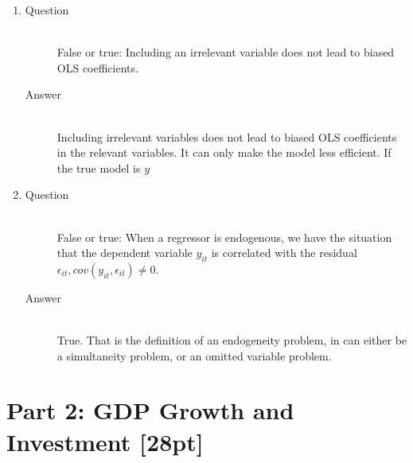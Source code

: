 \documentclass{article}
\begin{document}
\begin{enumerate}
  \item
  \begin{description}
    \item[Question] \hfill \\
    False or true: Including an irrelevant variable does not lead to biased OLS coefficients.
    \item[Answer] \hfill \\
    Including irrelevant variables does not lead to biased OLS coefficients in the relevant variables. It can only make the model less efficient. If the true model is $y$
  \end{description}
  
  \item
  \begin{description}
    \item[Question] \hfill \\
    False or true: When a regressor is endogenous, we have the situation that the dependent variable $y_{it}$ is correlated with the residual $\epsilon_{it},cov(y_{it},\epsilon_{it}) \neq 0$.
    \item[Answer] \hfill \\
    True. That is the definition of an endogeneity problem, in can either be a simultaneity problem, or an omitted variable problem.
  \end{description}
  
\end{enumerate}

\section{Part 2: GDP Growth and Investment [28pt]}
\end{document}
